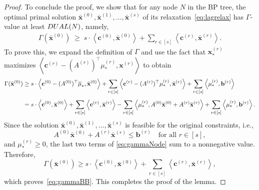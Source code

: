 \documentclass[10pt,a4paper]{amsart}
\newcommand{\LAG}{\textup{DUAL}}
\newcommand{\bv}[0]{\mathbf{b}}
\newcommand{\cv}[0]{\mathbf{c}}
\newcommand{\iprod}[2]{\left\langle {#1}, {#2} \right\rangle}
\newcommand{\xv}[0]{\mathbf{x}}
\begin{document}
\begin{proof}
To conclude the proof, we show that for any node $N$ in the BP tree, the optimal
primal solution
$\bar{\xv}^{(0)}, \bar{\xv}^{(1)}, \ldots, \bar{\xv}^{(s)}$
of its relaxation~\eqref{eq:lagrelax} has $\Gamma$-value at least $\LAG(N)$, namely,
\begin{align}
\Gamma(\bar{\xv}^{(0)})
\;\ge\;
s \cdot \iprod{\cv^{(0)}}{\bar{\xv}^{(0)}}
+ \sum_{r \in [s]} \iprod{\cv^{(r)}}{\bar{\xv}^{(r)}} .
\label{eq:gammaBB}
\end{align}
To prove this, we expand the definition of $\Gamma$ and use the
fact that $\xv_*^{(r)}$ maximizes
$\iprod{\cv^{(r)} - (A^{(r)})^{\top} \mu_*^{(r)}}{\xv^{(r)}}$ to obtain
\begin{align}
\Gamma(\bar{\xv}^{(0)})
&\ge
s \cdot \iprod{\cv^{(0)} - (A^{(0)})^{\top} \overline{\mu}_*}{\bar{\xv}^{(0)}}
+ \sum_{r \in [s]} \iprod{\cv^{(r)} - (A^{(r)})^{\top} \mu_*^{(r)}}{\bar{\xv}^{(r)}}
+ \sum_{r \in [s]} \iprod{\mu_*^{(r)}}{\bv^{(r)}} \notag\\[4pt]
&=
s \cdot \iprod{\cv^{(0)}}{\bar{\xv}^{(0)}}
+ \sum_{r \in [s]} \iprod{\cv^{(r)}}{\bar{\xv}^{(r)}}
- \sum_{r \in [s]} \iprod{\mu_*^{(r)}}{A^{(0)} \bar{\xv}^{(0)} + A^{(r)} \bar{\xv}^{(r)}}
+ \sum_{r \in [s]} \iprod{\mu_*^{(r)}}{\bv^{(r)}}. \label{eq:gammaNode}
\end{align}
Since the solution
$\bar{\xv}^{(0)}, \bar{\xv}^{(1)}, \ldots, \bar{\xv}^{(s)}$
is feasible for the original constraints, i.e.,
\[
A^{(0)} \bar{\xv}^{(0)} + A^{(r)} \bar{\xv}^{(r)} \le \bv^{(r)}
\quad \text{for all } r \in [s],
\]
and $\mu_*^{(r)} \ge 0$, the last two terms of \eqref{eq:gammaNode} sum to a nonnegative value. Therefore,
\[
\Gamma(\bar{\xv}^{(0)})
\ge
s \cdot \iprod{\cv^{(0)}}{\bar{\xv}^{(0)}}
+ \sum_{r \in [s]} \iprod{\cv^{(r)}}{\bar{\xv}^{(r)}},
\]
which proves~\eqref{eq:gammaBB}. This completes the proof of the lemma.
\end{proof}
\end{document}
